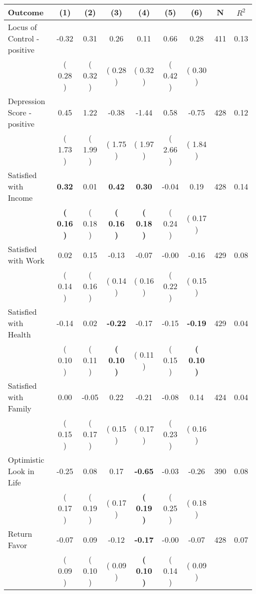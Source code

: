 \begin{tabular}{lcccccccc}
\toprule
 \textbf{Outcome} & \textbf{(1)} & \textbf{(2)} & \textbf{(3)} & \textbf{(4)} & \textbf{(5)} & \textbf{(6)} & \textbf{N} & \textbf{$ R^2$} \\
\midrule
Locus of Control - positive &     -0.32 &      0.31 &      0.26 &      0.11 &      0.66 &      0.28 & 411 &       0.13 \\ 
 & (     0.28 ) & (     0.32 ) & (     0.28 ) & (     0.32 ) & (     0.42 ) & (     0.30 ) & \\
Depression Score - positive &      0.45 &      1.22 &     -0.38 &     -1.44 &      0.58 &     -0.75 & 428 &       0.12 \\ 
 & (     1.73 ) & (     1.99 ) & (     1.75 ) & (     1.97 ) & (     2.66 ) & (     1.84 ) & \\
Satisfied with Income & \textbf{     0.32} &      0.01 & \textbf{     0.42} & \textbf{     0.30} &     -0.04 &      0.19 & 428 &       0.14 \\ 
 & \textbf{(     0.16 )} & (     0.18 ) & \textbf{(     0.16 )} & \textbf{(     0.18 )} & (     0.24 ) & (     0.17 ) & \\
Satisfied with Work &      0.02 &      0.15 &     -0.13 &     -0.07 &     -0.00 &     -0.16 & 429 &       0.08 \\ 
 & (     0.14 ) & (     0.16 ) & (     0.14 ) & (     0.16 ) & (     0.22 ) & (     0.15 ) & \\
Satisfied with Health &     -0.14 &      0.02 & \textbf{    -0.22} &     -0.17 &     -0.15 & \textbf{    -0.19} & 429 &       0.04 \\ 
 & (     0.10 ) & (     0.11 ) & \textbf{(     0.10 )} & (     0.11 ) & (     0.15 ) & \textbf{(     0.10 )} & \\
Satisfied with Family &      0.00 &     -0.05 &      0.22 &     -0.21 &     -0.08 &      0.14 & 424 &       0.04 \\ 
 & (     0.15 ) & (     0.17 ) & (     0.15 ) & (     0.17 ) & (     0.23 ) & (     0.16 ) & \\
Optimistic Look in Life &     -0.25 &      0.08 &      0.17 & \textbf{    -0.65} &     -0.03 &     -0.26 & 390 &       0.08 \\ 
 & (     0.17 ) & (     0.19 ) & (     0.17 ) & \textbf{(     0.19 )} & (     0.25 ) & (     0.18 ) & \\
Return Favor &     -0.07 &      0.09 &     -0.12 & \textbf{    -0.17} &     -0.00 &     -0.07 & 428 &       0.07 \\ 
 & (     0.09 ) & (     0.10 ) & (     0.09 ) & \textbf{(     0.10 )} & (     0.14 ) & (     0.09 ) & \\

\end{tabular}
